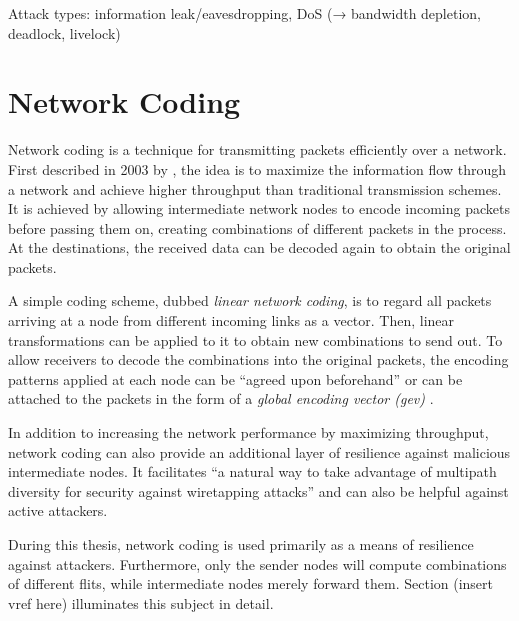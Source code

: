 Attack types: information leak/eavesdropping, DoS (→ bandwidth depletion, deadlock, livelock)

\section{Network Coding}\label{sec:networkcodingfun}
Network coding is a technique for transmitting packets efficiently over a network. First described in 2003 by \citeauthor{li03linearnc}
\cite{li03linearnc}, the idea is to maximize the information flow through a network and achieve higher throughput than traditional transmission
schemes. It is achieved by allowing intermediate network nodes to encode incoming packets before passing them on, creating combinations of different
packets in the process. At the destinations, the received data can be decoded again to obtain the original packets.

A simple coding scheme, dubbed \textit{linear network coding}, is to regard all packets arriving at a node from different incoming links as a vector.
Then, linear transformations can be applied to it to obtain new combinations to send out. \cite[1]{li03linearnc} To allow receivers to decode the
combinations into the original packets, the encoding patterns applied at each node can be \enquote{agreed upon beforehand} \cite[1]{li03linearnc} or
can be attached to the packets in the form of a \textit{global encoding vector (\gls{gev})} \cite[5\psq]{chou07ncforinternetandwireless}.

In addition to increasing the network performance by maximizing throughput, network coding can also provide an additional layer of resilience against
malicious intermediate nodes. It facilitates \enquote{a natural way to take advantage of multipath diversity for security against wiretapping attacks}
\cite[8]{fragouli07ncfundamentals} and can also be helpful against active attackers.

During this thesis, network coding is used primarily as a means of resilience against attackers. Furthermore, only the sender nodes will compute
combinations of different flits, while intermediate nodes merely forward them. Section (insert vref here) illuminates this subject in detail.
